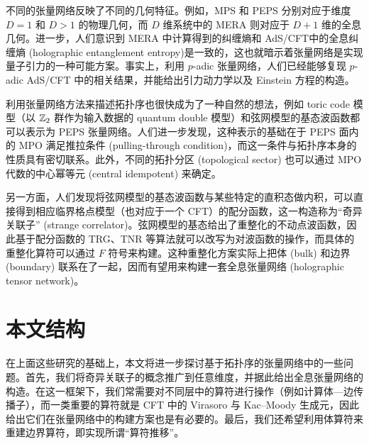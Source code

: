 不同的张量网络反映了不同的几何特征。例如，MPS 和 PEPS 分别对应于维度 $D=1$ 和 $D>1$ 的物理几何，而 $D$ 维系统中的 MERA 则对应于 $D+1$ 维的全息几何\cite{evenbly2011tensor}。进一步，人们意识到 MERA 中计算得到的纠缠熵和 AdS/CFT\cite{maldacena1999large}中的全息纠缠熵 (holographic entanglement entropy)\cite{ryu2006holographic}是一致的\cite{swingle2012entanglement,swingle2012constructing}，这也就暗示着张量网络是实现量子引力的一种可能方案。事实上，利用 $p$-adic 张量网络，人们已经能够复现 $p$-adic AdS/CFT 中的相关结果\cite{bhattacharyya2018tensor,hung2019padic}，并能给出引力动力学以及 Einstein 方程的构造\cite{chen2021emergent}。

利用张量网络方法来描述拓扑序也很快成为了一种自然的想法，例如 toric code 模型（以 $\mathbb{Z}_2$ 群作为输入数据的 quantum double 模型）和弦网模型的基态波函数都可以表示为 PEPS 张量网络\cite{verstraete2006criticality,gu2009tensor2,buerschaper2009explicit,luo2017structure}。人们进一步发现，这种表示的基础在于 PEPS 面内的 MPO 满足推拉条件 (pulling-through condition)，而这一条件与拓扑序本身的性质具有密切联系\cite{bultinck2017anyons,sahinoglu2021characterizing}。此外，不同的拓扑分区 (topological sector) 也可以通过 MPO 代数的中心幂等元 (central idempotent) 来确定\cite{bultinck2017anyons,vanhove2018mapping,aasen2020topological}。

另一方面，人们发现将弦网模型的基态波函数与某些特定的直积态做内积，可以直接得到相应临界格点模型（也对应于一个 CFT）的配分函数，这一构造称为“奇异关联子” (strange correlator)\cite{you2014wave,vanhove2018mapping,lootens2019cardy,aasen2020topological,vanhove2022topological}。弦网模型的基态给出了重整化的不动点波函数\cite{konig2009exact,konig2010quantum}，因此基于配分函数的 TRG、TNR 等算法就可以改写为对波函数的操作，而具体的重整化算符可以通过 $F$ 符号来构建。这种重整化方案实际上把体 (bulk) 和边界 (boundary) 联系在了一起，因而有望用来构建一套全息张量网络 (holographic tensor network)。

\section{本文结构}

在上面这些研究的基础上，本文将进一步探讨基于拓扑序的张量网络中的一些问题。首先，我们将奇异关联子的概念推广到任意维度，并据此给出全息张量网络的构造。在这一框架下，我们常需要对不同层中的算符进行操作（例如计算体—边传播子），而一类重要的算符就是 CFT 中的 Virasoro 与 Kac--Moody 生成元，因此给出它们在张量网络中的构建方案也是有必要的。最后，我们还希望利用体算符来重建边界算符，即实现所谓“算符推移”。


